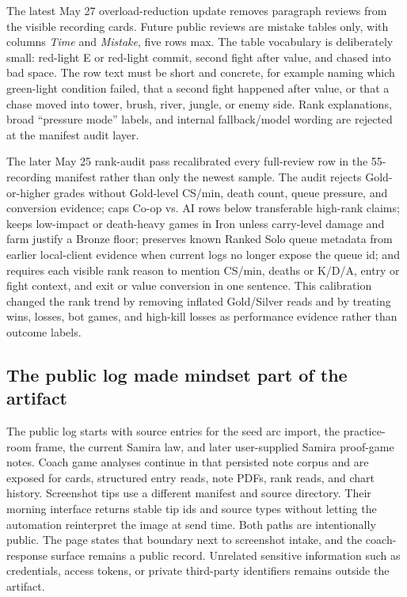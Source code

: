 \documentclass[12pt,letterpaper]{article}
\begin{document}
\noindent The latest May 27 overload-reduction update removes paragraph reviews from the visible recording cards. Future public reviews are mistake tables only, with columns \emph{Time} and \emph{Mistake}, five rows max. The table vocabulary is deliberately small: red-light E or red-light commit, second fight after value, and chased into bad space. The row text must be short and concrete, for example naming which green-light condition failed, that a second fight happened after value, or that a chase moved into tower, brush, river, jungle, or enemy side. Rank explanations, broad ``pressure mode'' labels, and internal fallback/model wording are rejected at the manifest audit layer.

\noindent The later May 25 rank-audit pass recalibrated every full-review row in the 55-recording manifest rather than only the newest sample. The audit rejects Gold-or-higher grades without Gold-level CS/min, death count, queue pressure, and conversion evidence; caps Co-op vs. AI rows below transferable high-rank claims; keeps low-impact or death-heavy games in Iron unless carry-level damage and farm justify a Bronze floor; preserves known Ranked Solo queue metadata from earlier local-client evidence when current logs no longer expose the queue id; and requires each visible rank reason to mention CS/min, deaths or K/D/A, entry or fight context, and exit or value conversion in one sentence. This calibration changed the rank trend by removing inflated Gold/Silver reads and by treating wins, losses, bot games, and high-kill losses as performance evidence rather than outcome labels.

\subsection{The public log made mindset part of the artifact}

The public log starts with source entries for the seed arc import, the practice-room frame, the current Samira law, and later user-supplied Samira proof-game notes. Coach game analyses continue in that persisted note corpus and are exposed for cards, structured entry reads, note PDFs, rank reads, and chart history. Screenshot tips use a different manifest and source directory. Their morning interface returns stable tip ids and source types without letting the automation reinterpret the image at send time. Both paths are intentionally public. The page states that boundary next to screenshot intake, and the coach-response surface remains a public record. Unrelated sensitive information such as credentials, access tokens, or private third-party identifiers remains outside the artifact.
\end{document}
